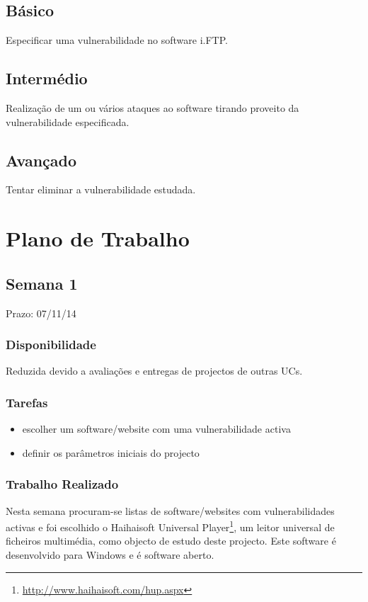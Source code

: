 \documentclass[a4paper]{article}
\begin{document}
\subsection*{Básico}
Especificar uma vulnerabilidade no software i.FTP.
\subsection*{Intermédio}
Realização de um ou vários ataques ao software tirando proveito da vulnerabilidade especificada.
\subsection*{Avançado}
Tentar eliminar a vulnerabilidade estudada.


\pagebreak
\section{Plano de Trabalho}

\subsection{Semana 1}
Prazo: 07/11/14
\subsubsection{Disponibilidade}
Reduzida devido a avaliações e entregas de projectos de outras UCs.

\subsubsection{Tarefas}
\begin{itemize}
\item escolher um software/website com uma vulnerabilidade activa
\item definir os parâmetros iniciais do projecto
\end{itemize}

\subsubsection{Trabalho Realizado}
Nesta semana procuram-se listas de software/websites com vulnerabilidades activas e foi escolhido o Haihaisoft Universal Player\footnote{\url{http://www.haihaisoft.com/hup.aspx}}, um leitor universal de ficheiros multimédia, como objecto de estudo deste projecto. Este software é desenvolvido para Windows e é software aberto.
\end{document}
